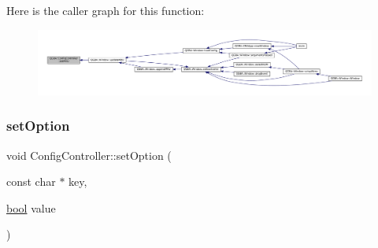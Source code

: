 Here is the caller graph for this function\+:
\nopagebreak
\begin{figure}[H]
\begin{center}
\leavevmode
\includegraphics[width=350pt]{class_q_g_b_a_1_1_config_controller_ae8779e0933a56b6b08cf368660432ac1_icgraph}
\end{center}
\end{figure}
\mbox{\label{class_q_g_b_a_1_1_config_controller_ace91684a6678e30d8366fd7262c176dd}} 
\subsubsection{\texorpdfstring{set\+Option}{setOption}\hspace{0.1cm}{\footnotesize\ttfamily [1/5]}}
{\footnotesize\ttfamily void Config\+Controller\+::set\+Option (\begin{DoxyParamCaption}\item[{const char $\ast$}]{key,  }\item[{\mbox{\hyperlink{libretro_8h_a4a26dcae73fb7e1528214a068aca317e}{bool}}}]{value }\end{DoxyParamCaption})\hspace{0.3cm}{\ttfamily [slot]}}

